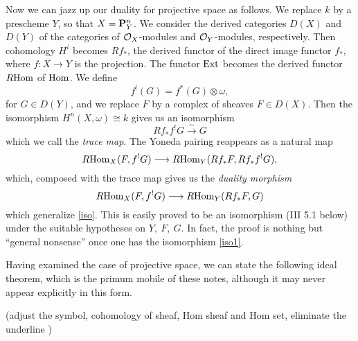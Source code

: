 Now we can jazz up our duality for projective space as follows. We replace $k$ by a prescheme $Y$, so that $X=\mathbf{P}^n_Y$. We consider the derived categories $D(X)$ and $D(Y)$ of the categories of $\mathcal{O}_X$-modules and $\mathcal{O}_Y$-modules, respectively. Then cohomology $H^i$ becomes $Rf_*$, the derived functor of the direct image functor $f_*$, where $f:X\to Y$ is the projection. The functor $\mathrm{Ext}$ becomes the derived functor $R\mathrm{Hom}$ of $\mathrm{Hom}$. We define
\[f^{!}(G)=f^*(G)\otimes \omega,\]
for $G\in D(Y)$, and we replace $F$ by a complex of sheaves $F\in D(X)$. Then the isomorphism $H^n(X,\omega)\cong k$ gives us an isomorphism
\[Rf_*f^!G \xrightarrow{\sim} G \]
which we call the {\it trace map}. The Yoneda pairing reappears as a natural map 
\begin{equation}\label{map1}
R\mathrm{Hom}_X(F,f^!G) \longrightarrow R\mathrm{Hom}_Y(Rf_*F,Rf_*f^!G),
\end{equation}
which, composed with the trace map gives us the {\it duality morphism}
\[R\mathrm{Hom}_X(F,f^!G) \longrightarrow R\mathrm{Hom}_Y(Rf_*F,G)\]
which generalize \ref{iso}. This is easily proved to be an isomorphism (III 5.1 below) under the suitable hypotheses on $Y,~F,~G$. In fact, the proof is nothing but ``general nonsense'' once one has the isomorphism \ref{iso1}.

Having examined the case of projective space, we can state the following ideal theorem, which is the primum mobile of these notes, although it may never appear explicitly in this form.

(adjust the symbol, cohomology of sheaf, Hom sheaf and Hom set, eliminate the underline )


